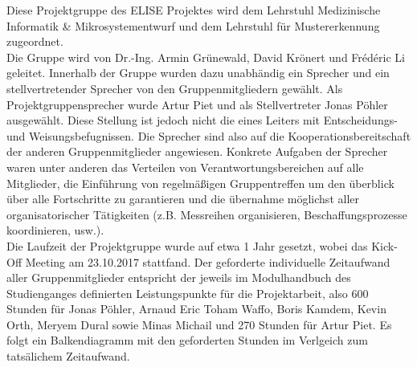 
Diese Projektgruppe des ELISE Projektes wird dem Lehrstuhl Medizinische Informatik \& Mikrosystementwurf und dem Lehrstuhl f{\"u}r Mustererkennung zugeordnet. \\

Die Gruppe wird von Dr.-Ing. Armin Gr{\"u}newald, David Kr{\"o}nert und Frédéric Li geleitet. 
Innerhalb der Gruppe wurden dazu unabh{\"a}ndig ein Sprecher und ein stellvertretender Sprecher von den Gruppenmitgliedern gew{\"a}hlt. Als Projektgruppensprecher wurde Artur Piet und als Stellvertreter Jonas P{\"o}hler ausgew{\"a}hlt. 
Diese Stellung ist jedoch nicht die eines Leiters mit Entscheidungs- und Weisungsbefugnissen. Die Sprecher sind also auf die Kooperationsbereitschaft der anderen Gruppenmitglieder angewiesen. 
Konkrete Aufgaben der Sprecher waren unter anderen das Verteilen von Verantwortungsbereichen auf alle Mitglieder, die Einf{\"u}hrung von regelm{\"a}{\ss}igen Gruppentreffen um den {\"u}berblick {\"u}ber alle Fortschritte zu garantieren und die {\"u}bernahme m{\"o}glichst aller organisatorischer T{\"a}tigkeiten (z.B. Messreihen organisieren, Beschaffungsprozesse koordinieren, usw.). \\

Die Laufzeit der Projektgruppe wurde auf etwa 1 Jahr gesetzt, wobei das Kick-Off Meeting am 23.10.2017 stattfand. Der geforderte individuelle Zeitaufwand aller Gruppenmitglieder entspricht der jeweils im Modulhandbuch des Studienganges definierten Leistungspunkte f{\"u}r die Projektarbeit, also 600 Stunden f{\"u}r Jonas P{\"o}hler, Arnaud Eric Toham Waffo, Boris Kamdem, Kevin Orth, Meryem Dural sowie Minas Michail und 270 Stunden f{\"u}r Artur Piet. Es folgt ein Balkendiagramm mit den geforderten Stunden im Verlgeich zum tats{\"a}lichem Zeitaufwand. \\

